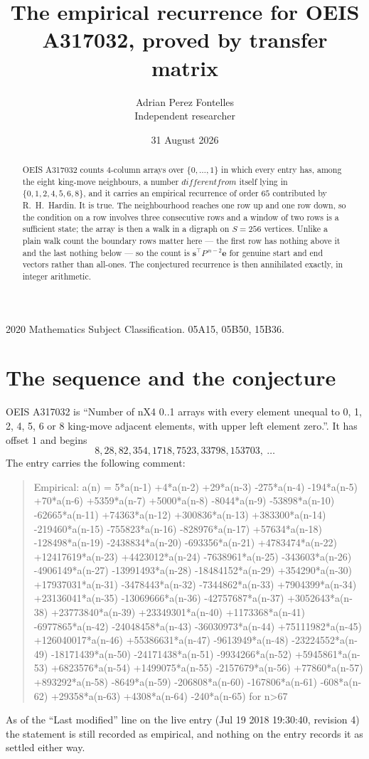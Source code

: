 \documentclass[11pt,a4paper]{article}
\title{The empirical recurrence for OEIS A317032, proved by transfer matrix}
\author{Adrian Perez Fontelles\\ \small Independent researcher}
\date{31 August 2026}
\theoremstyle{plain}
\theoremstyle{definition}
\begin{document}
\maketitle

\begin{abstract}
OEIS A317032 counts $4$-column arrays over $\{0,\dots,1\}$ in which every entry has,
among the eight king-move neighbours, a number $different from$ itself lying in $\{0,1,2,4,5,6,8\}$, and it carries an empirical
recurrence of order $65$ contributed by R.~H.~Hardin. It is true. The neighbourhood
reaches one row up and one row down, so the condition on a row involves three consecutive
rows and a window of two rows is a sufficient state; the array is then a walk in a digraph
on $S=256$ vertices. Unlike a plain walk count the boundary rows matter here --- the first
row has nothing above it and the last nothing below --- so the count is
$\mathbf{s}^{\!\top}P^{\,n-2}\mathbf{e}$ for genuine start and end vectors rather than
all-ones. The conjectured recurrence is then annihilated exactly, in integer arithmetic.
\end{abstract}

\noindent\small 2020 Mathematics Subject Classification. 05A15, 05B50, 15B36.\normalsize

\section{The sequence and the conjecture}

OEIS A317032 is ``Number of nX4 0..1 arrays with every element unequal to 0, 1, 2, 4, 5, 6 or 8 king-move adjacent elements, with upper left element zero.''. It has offset
$1$ and begins
\[
8, 28, 82, 354, 1718, 7523, 33798, 153703,\ \dots
\]
The entry carries the following comment:
\begin{quote}\small
Empirical: a(n) = 5*a(n-1) +4*a(n-2) +29*a(n-3) -275*a(n-4) -194*a(n-5) +70*a(n-6) +5359*a(n-7) +5000*a(n-8) -8044*a(n-9) -53898*a(n-10) -62665*a(n-11) +74363*a(n-12) +300836*a(n-13) +383300*a(n-14) -219460*a(n-15) -755823*a(n-16) -828976*a(n-17) +57634*a(n-18) -128498*a(n-19) -2438834*a(n-20) -693356*a(n-21) +4783474*a(n-22) +12417619*a(n-23) +4423012*a(n-24) -7638961*a(n-25) -343603*a(n-26) -4906149*a(n-27) -13991493*a(n-28) -18484152*a(n-29) +354290*a(n-30) +17937031*a(n-31) -3478443*a(n-32) -7344862*a(n-33) +7904399*a(n-34) +23136041*a(n-35) -13069666*a(n-36) -42757687*a(n-37) +3052643*a(n-38) +23773840*a(n-39) +23349301*a(n-40) +1173368*a(n-41) -6977865*a(n-42) -24048458*a(n-43) -36030973*a(n-44) +75111982*a(n-45) +126040017*a(n-46) +55386631*a(n-47) -9613949*a(n-48) -23224552*a(n-49) -18171439*a(n-50) -24171438*a(n-51) -9934266*a(n-52) +5945861*a(n-53) +6823576*a(n-54) +1499075*a(n-55) -2157679*a(n-56) +77860*a(n-57) +893292*a(n-58) -8649*a(n-59) -206808*a(n-60) -167806*a(n-61) -608*a(n-62) +29358*a(n-63) +4308*a(n-64) -240*a(n-65) for n>67
\end{quote}
As of the ``Last modified'' line on the live entry (Jul 19 2018 19:30:40, revision
4) the statement is still recorded as empirical, and nothing on the entry
records it as settled either way.
\end{document}
